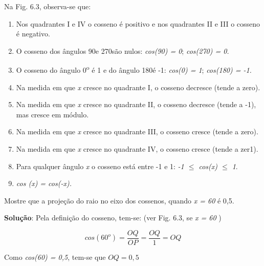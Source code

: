 Na  Fig. 6.3, observa-se que:

\begin{caixa}
\begin{enumerate}
    \item Nos quadrantes I e IV o cosseno é positivo e nos quadrantes II e III o cosseno é negativo.

    \item O cosseno dos ângulos 90\degree e 270\degree  são nulos: \textit{cos(90\degree) = 0};  \textit{cos(270\degree) = 0.}

    \item O cosseno do ângulo 0\textsuperscript{o} é 1 e do ângulo 180\degree é -1: \textit{cos(0\degree) = 1};  \textit{cos(180\degree) = -1.}

    \item  Na medida em que \textit{x} cresce no quadrante I, o cosseno decresce (tende a zero).

    \item Na medida em que \textit{x} cresce no quadrante II, o cosseno decresce (tende a -1), mas cresce em módulo.

    \item  Na medida em que \textit{x} cresce no quadrante III, o cosseno cresce (tende a zero).

    \item Na medida em que \textit{x} cresce no quadrante IV, o cosseno cresce (tende a zer1).

    \item Para qualquer ângulo \textit{x}  o cosseno está entre -1 e 1:   \textit{-1 $ \leq $  cos(x) $ \leq $  1}.

    \item    \textit{cos (x) = cos(-x).}
\end{enumerate}
\end{caixa}

\begin{texemplo}
Mostre que a projeção do raio no eixo dos cossenos, quando \textit{x = 60\degree} é 0,5.

\textbf{Solução}: Pela definição do cosseno, tem-se: (ver Fig. 6.3, se \textit{x = 60\degree} )

 \[ cos \left( 60^{o} \right) =\frac{OQ}{OP}=\frac{OQ}{1}=OQ \]

Como \textit{cos(60\degree) = 0,5}, tem-se que  \(  OQ=0,5 \) \qedsymbol
\end{texemplo}

